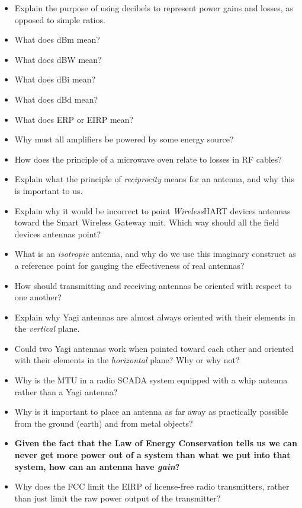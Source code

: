 \begin{itemize}
\item{} Explain the purpose of using decibels to represent power gains and losses, as opposed to simple ratios.
\item{} What does dBm mean?
\item{} What does dBW mean?
\item{} What does dBi mean?
\item{} What does dBd mean?
\item{} What does ERP or EIRP mean?
\item{} Why must all amplifiers be powered by some energy source?
\item{} How does the principle of a microwave oven relate to losses in RF cables?
\item{} Explain what the principle of {\it reciprocity} means for an antenna, and why this is important to us.
\item{} Explain why it would be incorrect to point {\sl Wireless}HART devices antennas toward the Smart Wireless Gateway unit.  Which way should all the field devices antennas point?
\item{} What is an {\it isotropic} antenna, and why do we use this imaginary construct as a reference point for gauging the effectiveness of real antennas?
\item{} How should transmitting and receiving antennas be oriented with respect to one another?
\item{} Explain why Yagi antennas are almost always oriented with their elements in the {\it vertical} plane.
\item{} Could two Yagi antennas work when pointed toward each other and oriented with their elements in the {\it horizontal} plane?  Why or why not?
\item{} Why is the MTU in a radio SCADA system equipped with a whip antenna rather than a Yagi antenna?
\item{} Why is it important to place an antenna as far away as practically possible from the ground (earth) and from metal objects?
\item{} {\bf Given the fact that the Law of Energy Conservation tells us we can never get more power out of a system than what we put into that system, how can an antenna have {\it gain}?}
\item{} Why does the FCC limit the EIRP of license-free radio transmitters, rather than just limit the raw power output of the transmitter?
\end{itemize}












